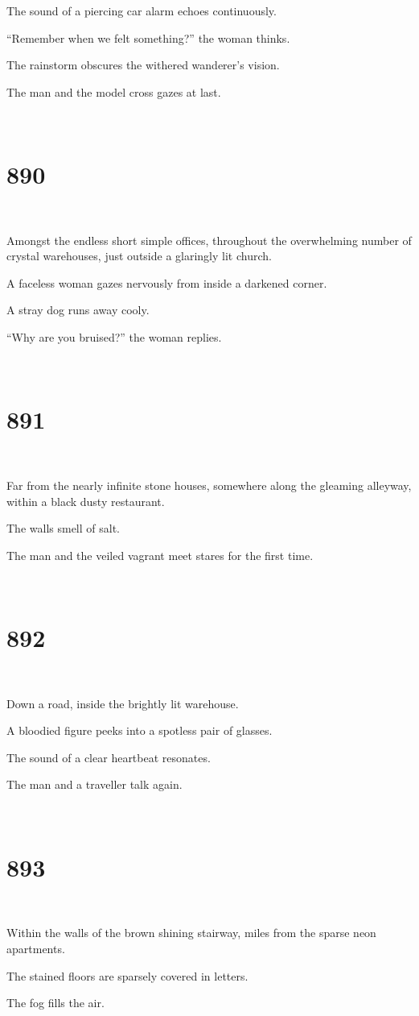 \documentclass{report}
\begin{document}
The sound of a piercing car alarm echoes continuously.

``Remember when we felt something?'' the woman thinks.

The rainstorm obscures the withered wanderer's vision.

The man and the model cross gazes at last.

~
\chapter*{890}
~

Amongst the endless short simple offices, throughout the overwhelming number of crystal warehouses, just outside a glaringly lit church.

A faceless woman gazes nervously from inside a darkened corner.

A stray dog runs away cooly.

``Why are you bruised?'' the woman replies.

~
\chapter*{891}
~

Far from the nearly infinite stone houses, somewhere along the gleaming alleyway, within a black dusty restaurant.

The walls smell of salt.

The man and the veiled vagrant meet stares for the first time.

~
\chapter*{892}
~

Down a road, inside the brightly lit warehouse.

A bloodied figure peeks into a spotless pair of glasses.

The sound of a clear heartbeat resonates.

The man and a traveller talk again.

~
\chapter*{893}
~

Within the walls of the brown shining stairway, miles from the sparse neon apartments.

The stained floors are sparsely covered in letters.

The fog fills the air.
\end{document}
